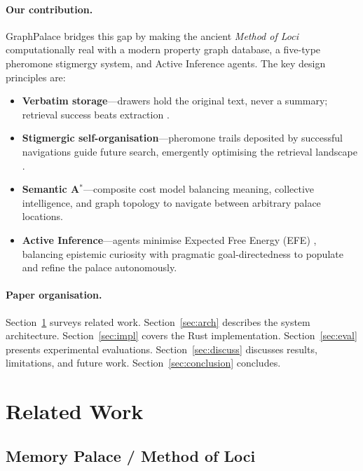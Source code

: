 \documentclass[11pt,a4paper]{article}
\begin{document}
\paragraph{Our contribution.}
GraphPalace bridges this gap by making the ancient \emph{Method of Loci}
\cite{yates1966} computationally real with a modern property graph database,
a five-type pheromone stigmergy system, and Active Inference agents.
The key design principles are:
\begin{itemize}[nosep]
\item \textbf{Verbatim storage}---drawers hold the original text, never a
      summary; retrieval success beats extraction \cite{jovovich2026}.
\item \textbf{Stigmergic self-organisation}---pheromone trails deposited by
      successful navigations guide future search, emergently optimising the
      retrieval landscape \cite{grasse1959,dorigo1996}.
\item \textbf{Semantic A$^*$}---composite cost model balancing meaning,
      collective intelligence, and graph topology to navigate between
      arbitrary palace locations.
\item \textbf{Active Inference}---agents minimise Expected Free Energy (EFE)
      \cite{friston2010}, balancing epistemic curiosity with pragmatic
      goal-directedness to populate and refine the palace autonomously.
\end{itemize}

\paragraph{Paper organisation.}
Section~\ref{sec:related} surveys related work.
Section~\ref{sec:arch} describes the system architecture.
Section~\ref{sec:impl} covers the Rust implementation.
Section~\ref{sec:eval} presents experimental evaluations.
Section~\ref{sec:discuss} discusses results, limitations, and future work.
Section~\ref{sec:conclusion} concludes.

\section{Related Work}
\label{sec:related}

\subsection{Memory Palace / Method of Loci}
\end{document}
